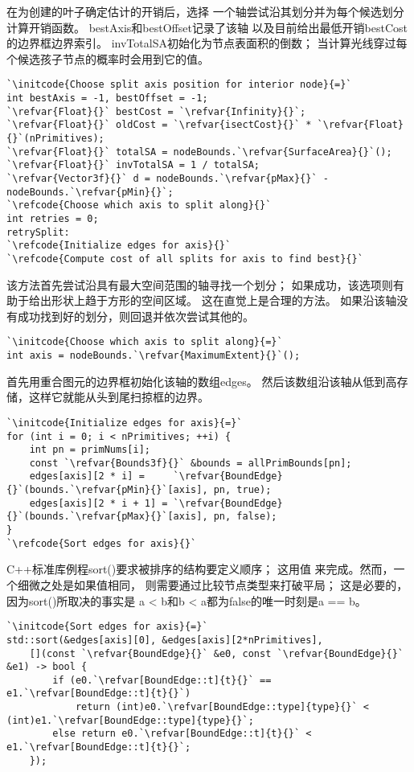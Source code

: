 在为创建的叶子确定估计的开销后，选择
一个轴尝试沿其划分并为每个候选划分计算开销函数。
{\ttfamily bestAxis}和{\ttfamily bestOffset}记录了该轴
以及目前给出最低开销{\ttfamily bestCost}的边界框边界索引。
{\ttfamily invTotalSA}初始化为节点表面积的倒数；
当计算光线穿过每个候选孩子节点的概率时会用到它的值。
\begin{lstlisting}
`\initcode{Choose split axis position for interior node}{=}`
int bestAxis = -1, bestOffset = -1;
`\refvar{Float}{}` bestCost = `\refvar{Infinity}{}`;
`\refvar{Float}{}` oldCost = `\refvar{isectCost}{}` * `\refvar{Float}{}`(nPrimitives);
`\refvar{Float}{}` totalSA = nodeBounds.`\refvar{SurfaceArea}{}`();
`\refvar{Float}{}` invTotalSA = 1 / totalSA;
`\refvar{Vector3f}{}` d = nodeBounds.`\refvar{pMax}{}` - nodeBounds.`\refvar{pMin}{}`;
`\refcode{Choose which axis to split along}{}`
int retries = 0;
retrySplit:
`\refcode{Initialize edges for axis}{}`
`\refcode{Compute cost of all splits for axis to find best}{}`
\end{lstlisting}

该方法首先尝试沿具有最大空间范围的轴寻找一个划分；
如果成功，该选项则有助于给出形状上趋于方形的空间区域。
这在直觉上是合理的方法。
如果沿该轴没有成功找到好的划分，则回退并依次尝试其他的。
\begin{lstlisting}
`\initcode{Choose which axis to split along}{=}`
int axis = nodeBounds.`\refvar{MaximumExtent}{}`();
\end{lstlisting}

首先用重合图元的边界框初始化该轴的数组{\ttfamily edges}。
然后该数组沿该轴从低到高存储，这样它就能从头到尾扫掠框的边界。
\begin{lstlisting}
`\initcode{Initialize edges for axis}{=}`
for (int i = 0; i < nPrimitives; ++i) {
    int pn = primNums[i];
    const `\refvar{Bounds3f}{}` &bounds = allPrimBounds[pn];
    edges[axis][2 * i] =     `\refvar{BoundEdge}{}`(bounds.`\refvar{pMin}{}`[axis], pn, true);
    edges[axis][2 * i + 1] = `\refvar{BoundEdge}{}`(bounds.`\refvar{pMax}{}`[axis], pn, false);
}
`\refcode{Sort edges for axis}{}`
\end{lstlisting}

C++标准库例程{\ttfamily sort()}要求被排序的结构要定义顺序；
这用值
来完成。然而，一个细微之处是如果值相同，
则需要通过比较节点类型来打破平局；
这是必要的，因为{\ttfamily sort()}所取决的事实是
{\ttfamily a < b}和{\ttfamily b < a}都为{\ttfamily false}的唯一时刻是{\ttfamily a == b}。
\begin{lstlisting}
`\initcode{Sort edges for axis}{=}`
std::sort(&edges[axis][0], &edges[axis][2*nPrimitives],
    [](const `\refvar{BoundEdge}{}` &e0, const `\refvar{BoundEdge}{}` &e1) -> bool {
        if (e0.`\refvar[BoundEdge::t]{t}{}` == e1.`\refvar[BoundEdge::t]{t}{}`)
            return (int)e0.`\refvar[BoundEdge::type]{type}{}` < (int)e1.`\refvar[BoundEdge::type]{type}{}`;
        else return e0.`\refvar[BoundEdge::t]{t}{}` < e1.`\refvar[BoundEdge::t]{t}{}`;
    });
\end{lstlisting}

